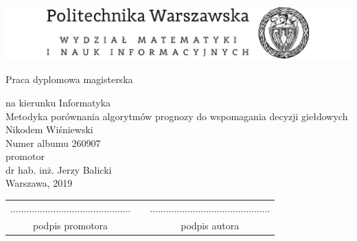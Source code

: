 \documentclass[a4paper, twoside, 11pt, openright]{article}
\newcommand{\myTitle}{Metodyka porównania algorytmów prognozy do wspomagania decyzji giełdowych}
\newcommand{\myName}{Nikodem Wiśniewski}
\newcommand{\myNumber}{260907}
\newcommand{\myThesisType}{Praca dyplomowa magisterska}
\newcommand{\myCourse}{Informatyka}
\newcommand{\myProf}{dr hab. inż. Jerzy Balicki}
\newcommand{\myYear}{2019}
\newcommand{\fncyfront}{%
	\fancyhead[RO]{}
	\fancyfoot[RO]{}
	\fancyhead[LE]{}
	\fancyfoot[LE]{}
	\fancyhead[RE,LO]{}
	\fancyfoot[C]{}
	\renewcommand{\headrulewidth}{0pt}}
\newcommand{\fncymain}{%
	\fancyhead[RO]{{\footnotesize \rightmark}}
	\fancyfoot[RO]{\thepage}
	\fancyhead[LE]{{\footnotesize \leftmark}}
	\fancyfoot[LE]{\thepage}
	\fancyfoot[C]{}
	\renewcommand{\headrulewidth}{0.3pt}}
\begin{document}
\fncyfront
\begin{titlepage}
\begingroup
\begin{center}		
			\includegraphics[width=1.0\textwidth]{img/pw_header}
			
			\vspace{1.0cm}
			\fontsize{24}{30}\selectfont\myThesisType
			\fontsize{12}{14}\selectfont
			
			\vspace{0.5cm}
			na kierunku \myCourse \\
			\vspace{1cm}
			{\fontsize{14}{18}\selectfont \myTitle} \\ 
			
			\vspace{1.5cm}
			\fontsize{21}{25}\selectfont \myName \\
			\fontsize{12}{14}\selectfont
			Numer albumu \myNumber \\

			\vspace{6.5cm}
			promotor \\
			\myProf \\
			\vspace{0.5cm}
			\vfill 
			Warszawa, \myYear
        \vfill                      
\end{center}
\endgroup
\end{titlepage}

\newpage
\hfill
\begin{table}[b]
\centering
\begin{tabular}[t]{ccc}
............................................. & \hspace*{100pt} & .............................................\\
podpis promotora & \hspace*{100pt} & podpis autora
\end{tabular}
\end{table}

\fncymain

\newpage

\tableofcontents

\newpage
\end{document}
